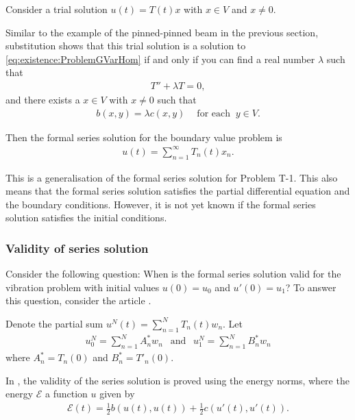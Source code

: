 \documentclass[../../main.tex]{subfiles}
\begin{document}
Consider a trial solution $u(t) = T(t)x$ with $x \in V$ and $x \neq 0$.

Similar to the example of the pinned-pinned beam in the previous section, substitution shows that this trial solution is a solution to \eqref{eq:existence:ProblemGVarHom} if and only if you can find a real number $\lambda$ such that 
\begin{eqnarray}
	T''  + \lambda T = 0,
\end{eqnarray}
and there exists a $x \in V$ with $x \neq 0$ such that
\begin{eqnarray}
	b(x,y) = \lambda c(x,y) \ \ \ \ \textrm{ for each } \ y \in V.
\end{eqnarray}

Then the formal series solution for the boundary value problem is
\begin{eqnarray}
	u(t) = \sum_{n=1}^{\infty} T_n(t)x_n. \label{eq:1D_Model:ModalAnalysisSeriesSolution}
\end{eqnarray}

This is a generalisation of the formal series solution for Problem T-1. This also means that the formal series solution satisfies the partial differential equation and the boundary conditions. However, it is not yet known if the formal series solution satisfies the initial conditions.

\subsubsection{Validity of series solution}
Consider the following question: When is the formal series solution valid for the vibration problem with initial values $u(0) = u_0$ and $u'(0) = u_1$? To answer this question, consider the article \cite{CVV18}.

Denote the partial sum $u^{N}(t) = \sum_{n=1}^{N} T_{n}(t)w_n$. Let
\begin{eqnarray*}
	u_0^{N} = \sum_{n=1}^{N} A^*_n w_n \ \ \textrm{ and } \ \ u_{1}^{N} =\sum_{n=1}^{N} B^*_n w_n
\end{eqnarray*} where $A^*_n = T_n(0)$ and $B^*_n = T'_n(0)$.

In \cite{CVV18}, the validity of the series solution is proved using the energy norms, where the energy $\mathcal{E}$ a function $u$ given by
\begin{eqnarray}
	\mathcal{E} (t) = \frac{1}{2} b(u(t), u(t)) + \frac{1}{2} c(u'(t), u'(t)). \label{eq:1D_Model:ModalAnalysisEnergy}
\end{eqnarray}
\end{document}
